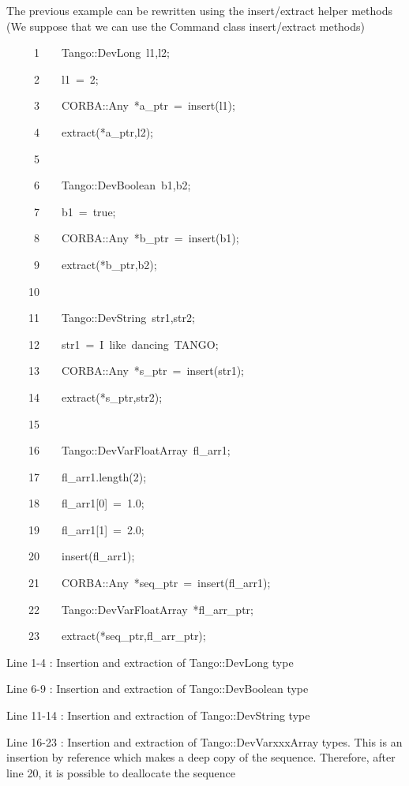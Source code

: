 The previous example can be rewritten using the insert/extract helper
methods (We suppose that we can use the Command class insert/extract
methods)


\begin{lyxcode}
~~~~~1~~~~Tango::DevLong~l1,l2;

~~~~~2~~~~l1~=~2;

~~~~~3~~~~CORBA::Any~{*}a\_ptr~=~insert(l1);

~~~~~4~~~~extract({*}a\_ptr,l2);

~~~~~5~~

~~~~~6~~~~Tango::DevBoolean~b1,b2;

~~~~~7~~~~b1~=~true;

~~~~~8~~~~CORBA::Any~{*}b\_ptr~=~insert(b1);

~~~~~9~~~~extract({*}b\_ptr,b2);

~~~~10~~

~~~~11~~~~Tango::DevString~str1,str2;

~~~~12~~~~str1~=~\textquotedbl{}I~like~dancing~TANGO\textquotedbl{};

~~~~13~~~~CORBA::Any~{*}s\_ptr~=~insert(str1);

~~~~14~~~~extract({*}s\_ptr,str2);

~~~~15~~

~~~~16~~~~Tango::DevVarFloatArray~fl\_arr1;

~~~~17~~~~fl\_arr1.length(2);

~~~~18~~~~fl\_arr1{[}0{]}~=~1.0;

~~~~19~~~~fl\_arr1{[}1{]}~=~2.0;

~~~~20~~~~insert(fl\_arr1);

~~~~21~~~~CORBA::Any~{*}seq\_ptr~=~insert(fl\_arr1);

~~~~22~~~~Tango::DevVarFloatArray~{*}fl\_arr\_ptr;

~~~~23~~~~extract({*}seq\_ptr,fl\_arr\_ptr);
\end{lyxcode}


Line 1-4 : Insertion and extraction of Tango::DevLong type

Line 6-9 : Insertion and extraction of Tango::DevBoolean type 

Line 11-14 : Insertion and extraction of Tango::DevString type

Line 16-23 : Insertion and extraction of Tango::DevVarxxxArray types.
This is an insertion by reference which makes a deep copy of the sequence.
Therefore, after line 20, it is possible to deallocate the sequence

